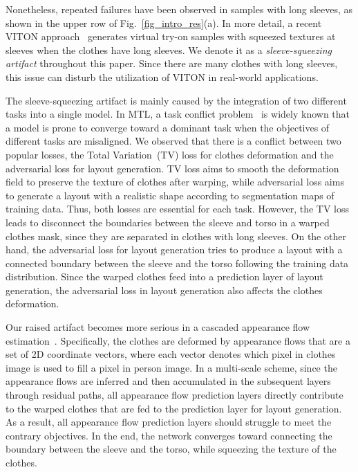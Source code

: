 \documentclass[letterpaper]{article} %
\begin{document}
Nonetheless, repeated failures have been observed in samples with long sleeves, as shown in the upper row of Fig.~\ref{fig_intro_res}(a).
In more detail, a recent VITON approach~\cite{lee2022hrviton} generates virtual try-on samples with squeezed textures at sleeves when the clothes have long sleeves.
We denote it as a \textit{sleeve-squeezing artifact} throughout this paper.
Since there are many clothes with long sleeves, this issue can disturb the utilization of VITON in real-world applications.

The sleeve-squeezing artifact is mainly caused by the integration of two different tasks into a single model.
In MTL, a task conflict problem~\cite{shi2023recon} is widely known that a model is prone to converge toward a dominant task when the objectives of different tasks are misaligned.
We observed that there is a conflict between two popular losses, the Total Variation~(TV) loss for clothes deformation and the adversarial loss for layout generation.
TV loss aims to smooth the deformation field to preserve the texture of clothes after warping, while adversarial loss aims to generate a layout with a realistic shape according to segmentation maps of training data. Thus, both losses are essential for each task. However, the TV loss leads to disconnect the boundaries between the sleeve and torso in a warped clothes mask, since they are separated in clothes with long sleeves. On the other hand, the adversarial loss for layout generation tries to produce a layout with a connected boundary between the sleeve and the torso following the training data distribution. Since the warped clothes feed into a prediction layer of layout generation, the adversarial loss in layout generation also affects the clothes deformation.

Our raised artifact becomes more serious in a cascaded appearance flow estimation~\cite{ge2021parser,zhou2016view}.
Specifically, the clothes are deformed by appearance flows that are a set of 2D coordinate vectors, where each vector denotes which pixel in clothes image is used to fill a pixel in person image.
In a multi-scale scheme, since the appearance flows are inferred and then accumulated in the subsequent layers through residual paths, all appearance flow prediction layers directly contribute to the warped clothes that are fed to the prediction layer for layout generation.
As a result, all appearance flow prediction layers should struggle to meet the contrary objectives.
In the end, the network converges toward connecting the boundary between the sleeve and the torso, while squeezing the texture of the clothes.
\end{document}
